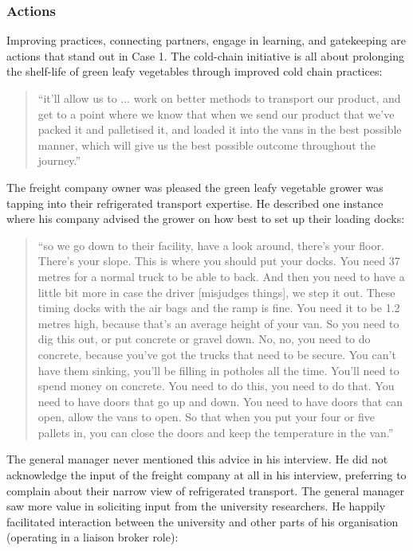 \subsubsection{Actions}

Improving practices, connecting partners, engage in learning, and gatekeeping are actions that stand out in Case 1. The cold-chain initiative is all about prolonging the shelf-life of green leafy vegetables through improved cold chain practices:

\begin{quote}
\small
\enquote{it'll allow us to ... work on better methods to transport our product, and get to a point where we know that when we send our product that we've packed it and palletised it, and loaded it into the vans in the best possible manner, which will give us the best possible outcome throughout the journey.} \\
\end{quote}

The freight company owner was pleased the green leafy vegetable grower was tapping into their refrigerated transport expertise. He described one instance where his company advised the grower on how best to set up their loading docks: 

\begin{quote}
\small
\enquote{so we go down to their facility, have a look around, there's your floor. There's your slope. This is where you should put your docks. You need 37 metres for a normal truck to be able to back. And then you need to have a little bit more in case the driver [misjudges things], we step it out. These timing docks with the air bags and the ramp is fine. You need it to be 1.2 metres high, because that’s an average height of your van. So you need to dig this out, or put concrete or gravel down. No, no, you need to do concrete, because you've got the trucks that need to be secure. You can't have them sinking, you'll be filling in potholes all the time. You'll need to spend money on concrete. You need to do this, you need to do that. You need to have doors that go up and down. You need to have doors that can open, allow the vans to open. So that when you put your four or five pallets in, you can close the doors and keep the temperature in the van.} \\
\end{quote}

The general manager never mentioned this advice in his interview. He did not acknowledge the input of the freight company at all in his interview, preferring to complain about their narrow view of refrigerated transport. The general manager saw more value in soliciting input from the university researchers. He happily facilitated interaction between the university and other parts of his organisation (operating in a liaison broker role):

